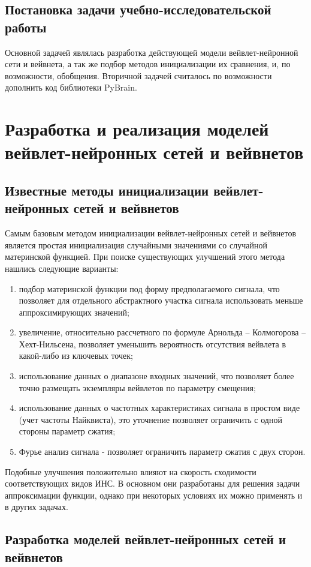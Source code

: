 \documentclass[utf8,usehyperref,14pt]{G7-32}
\begin{document}
\section{Постановка задачи учебно-исследовательской работы}
Основной задачей являлась разработка действующей модели вейвлет-нейронной сети и вейвнета, а так же подбор методов инициализации их сравнения, и, по возможности, обобщения. 
Вторичной задачей считалось по возможности дополнить код библиотеки PyBrain.



\chapter{Разработка и реализация моделей вейвлет-нейронных сетей и вейвнетов}
\section{Известные методы инициализации вейвлет-нейронных сетей и вейвнетов}
Самым базовым методом инициализации вейвлет-нейронных сетей и вейвнетов является простая инициализация случайными значениями со случайной материнской функцией. При поиске существующих улучшений этого метода нашлись следующие варианты:
\begin{enumerate}
\item подбор материнской функции под форму предполагаемого сигнала, что позволяет для отдельного абстрактного участка сигнала использовать меньше аппроксимирующих значений;
\item увеличение, относительно рассчетного по формуле Арнольда – Колмогорова – Хехт-Нильсена, позволяет уменьшить вероятность отсутствия вейвлета в какой-либо из ключевых точек;
\item использование данных о диапазоне входных значений, что позволяет более точно размещать экземпляры вейвлетов по параметру смещения;
\item использование данных о частотных характеристиках сигнала в простом виде (учет частоты Найквиста), это уточнение позволяет ограничить с одной стороны параметр сжатия;
\item Фурье анализ сигнала - позволяет ограничить параметр сжатия с двух сторон.
\end{enumerate}
Подобные улучшения положительно влияют на скорость сходимости соответствующих видов ИНС. В основном они разработаны для решения задачи аппроксимации функции, однако при некоторых условиях их можно применять и в других задачах.

\section{Разработка моделей вейвлет-нейронных сетей и вейвнетов}
\end{document}
